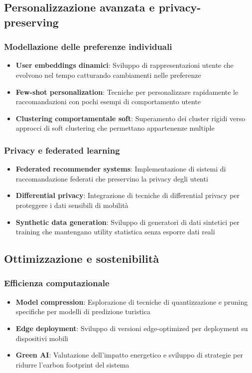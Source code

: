 \subsection{Personalizzazione avanzata e privacy-preserving}

\subsubsection{Modellazione delle preferenze individuali}
\begin{itemize}
\item \textbf{User embeddings dinamici}: Sviluppo di rappresentazioni utente che evolvono nel tempo catturando cambiamenti nelle preferenze
\item \textbf{Few-shot personalization}: Tecniche per personalizzare rapidamente le raccomandazioni con pochi esempi di comportamento utente
\item \textbf{Clustering comportamentale soft}: Superamento dei cluster rigidi verso approcci di soft clustering che permettano appartenenze multiple
\end{itemize}

\subsubsection{Privacy e federated learning}
\begin{itemize}
\item \textbf{Federated recommender systems}: Implementazione di sistemi di raccomandazione federati che preservino la privacy degli utenti
\item \textbf{Differential privacy}: Integrazione di tecniche di differential privacy per proteggere i dati sensibili di mobilità
\item \textbf{Synthetic data generation}: Sviluppo di generatori di dati sintetici per training che mantengano utility statistica senza esporre dati reali
\end{itemize}

\subsection{Ottimizzazione e sostenibilità}

\subsubsection{Efficienza computazionale}
\begin{itemize}
\item \textbf{Model compression}: Esplorazione di tecniche di quantizzazione e pruning specifiche per modelli di predizione turistica
\item \textbf{Edge deployment}: Sviluppo di versioni edge-optimized per deployment su dispositivi mobili
\item \textbf{Green AI}: Valutazione dell'impatto energetico e sviluppo di strategie per ridurre l'carbon footprint del sistema
\end{itemize}

